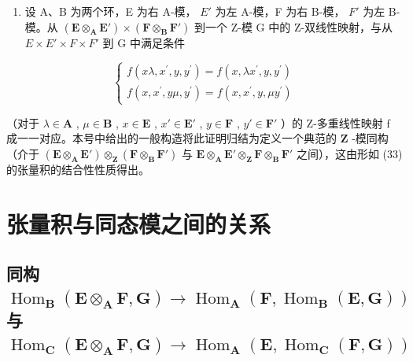 \begin{enumerate}
\def\labelenumi{(\arabic{enumi})}
\setcounter{enumi}{1}
\tightlist
\item
  设 A、B 为两个环，E 为右 A-模， \(E'\) 为左 A-模，F 为右 B-模， \(F'\) 为左 B-模。从 \((\mathbf{E} \otimes_{\mathbf{A}} \mathbf{E}') \times (\mathbf{F} \otimes_{\mathbf{B}} \mathbf{F}')\) 到一个 Z-模 G 中的 Z-双线性映射，与从 \(E \times E' \times F \times F'\) 到 G 中满足条件
\end{enumerate}

\[
\left\{ \begin{array}{l} f (x \lambda , x ^ {\prime}, y, y ^ {\prime}) = f (x, \lambda x ^ {\prime}, y, y ^ {\prime}) \\ f (x, x ^ {\prime}, y \mu , y ^ {\prime}) = f (x, x ^ {\prime}, y, \mu y ^ {\prime}) \end{array} \right.\tag{38}
\]

（对于 \(\lambda\in\mathbf{A}\) , \(\mu\in\mathbf{B}\) , \(x\in\mathbf{E}\) , \(x'\in\mathbf{E}'\) , \(y\in\mathbf{F}\) , \(y'\in\mathbf{F}'\) ）的 Z-多重线性映射 f 成一一对应。本号中给出的一般构造将此证明归结为定义一个典范的 \(\mathbf{Z}\) -模同构（介于 \((\mathbf{E}\otimes_{\mathbf{A}}\mathbf{E}')\otimes_{\mathbf{Z}}(\mathbf{F}\otimes_{\mathbf{B}}\mathbf{F}')\) 与 \(\mathbf{E}\otimes_{\mathbf{A}}\mathbf{E}'\otimes_{\mathbf{Z}}\mathbf{F}\otimes_{\mathbf{B}}\mathbf{F}'\) 之间），这由形如 (33) 的张量积的结合性性质得出。

\section{张量积与同态模之间的关系}

\subsection{\texorpdfstring{同构 \(\operatorname{Hom}_{\mathbf{B}}(\mathbf{E} \otimes_{\mathbf{A}} \mathbf{F}, \mathbf{G}) \to \operatorname{Hom}_{\mathbf{A}}(\mathbf{F}, \operatorname{Hom}_{\mathbf{B}}(\mathbf{E}, \mathbf{G}))\) 与 \(\operatorname{Hom}_{\mathbf{C}}(\mathbf{E} \otimes_{\mathbf{A}} \mathbf{F}, \mathbf{G}) \to \operatorname{Hom}_{\mathbf{A}}(\mathbf{E}, \operatorname{Hom}_{\mathbf{C}}(\mathbf{F}, \mathbf{G}))\)}{同构 \textbackslash operatorname\{Hom\}\_\{\textbackslash mathbf\{B\}\}(\textbackslash mathbf\{E\} \textbackslash otimes\_\{\textbackslash mathbf\{A\}\} \textbackslash mathbf\{F\}, \textbackslash mathbf\{G\}) \textbackslash 到 \textbackslash operatorname\{Hom\}\_\{\textbackslash mathbf\{A\}\}(\textbackslash mathbf\{F\}, \textbackslash operatorname\{Hom\}\_\{\textbackslash mathbf\{B\}\}(\textbackslash mathbf\{E\}, \textbackslash mathbf\{G\})) 且 \textbackslash operatorname\{Hom\}\_\{\textbackslash mathbf\{C\}\}(\textbackslash mathbf\{E\} \textbackslash otimes\_\{\textbackslash mathbf\{A\}\} \textbackslash mathbf\{F\}, \textbackslash mathbf\{G\}) \textbackslash 到 \textbackslash operatorname\{Hom\}\_\{\textbackslash mathbf\{A\}\}(\textbackslash mathbf\{E\}, \textbackslash operatorname\{Hom\}\_\{\textbackslash mathbf\{C\}\}(\textbackslash mathbf\{F\}, \textbackslash mathbf\{G\}))}}

